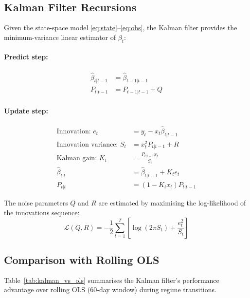 \documentclass[12pt, letterpaper]{article}
\begin{document}
\subsection{Kalman Filter Recursions}

Given the state-space model \eqref{eq:state}--\eqref{eq:obs}, the Kalman filter
provides the minimum-variance linear estimator of $\beta_t$:

\paragraph{Predict step:}
\begin{align}
  \hat{\beta}_{t|t-1} &= \hat{\beta}_{t-1|t-1} \label{eq:predict_mean}\\
  P_{t|t-1} &= P_{t-1|t-1} + Q \label{eq:predict_var}
\end{align}

\paragraph{Update step:}
\begin{align}
  \text{Innovation: } e_t &= y_t - x_t \hat{\beta}_{t|t-1} \label{eq:innovation}\\
  \text{Innovation variance: } S_t &= x_t^2 P_{t|t-1} + R \label{eq:innov_var}\\
  \text{Kalman gain: } K_t &= \frac{P_{t|t-1} x_t}{S_t} \label{eq:gain}\\
  \hat{\beta}_{t|t} &= \hat{\beta}_{t|t-1} + K_t e_t \label{eq:update_mean}\\
  P_{t|t} &= (1 - K_t x_t) P_{t|t-1} \label{eq:update_var}
\end{align}

The noise parameters $Q$ and $R$ are estimated by maximising the log-likelihood
of the innovations sequence:
\begin{equation}
  \mathcal{L}(Q, R) = -\frac{1}{2}\sum_{t=1}^T \left[\log(2\pi S_t) + \frac{e_t^2}{S_t}\right]
  \label{eq:loglik}
\end{equation}

\subsection{Comparison with Rolling OLS}

Table~\ref{tab:kalman_vs_ols} summarises the Kalman filter's performance
advantage over rolling OLS (60-day window) during regime transitions.
\end{document}
